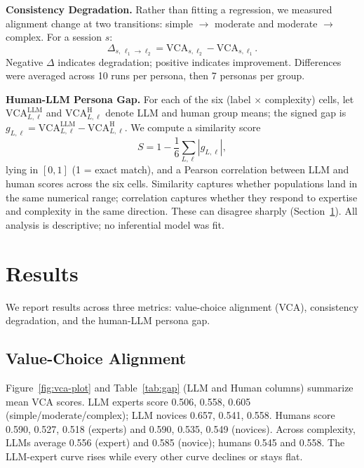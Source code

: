 \documentclass[manuscript,review]{acmart}
\begin{document}
\textbf{Consistency Degradation.} Rather than fitting a regression, we measured alignment change at two transitions: simple $\rightarrow$ moderate and moderate $\rightarrow$ complex. For a session $s$:
\begin{equation}
\Delta_{s,\,\ell_1 \rightarrow \ell_2} = \mathrm{VCA}_{s,\ell_2} - \mathrm{VCA}_{s,\ell_1}.
\end{equation}
Negative $\Delta$ indicates degradation; positive indicates improvement. Differences were averaged across 10 runs per persona, then 7 personas per group.

\textbf{Human-LLM Persona Gap.} For each of the six (label $\times$ complexity) cells, let $\mathrm{VCA}^{\text{LLM}}_{L,\ell}$ and $\mathrm{VCA}^{\text{H}}_{L,\ell}$ denote LLM and human group means; the signed gap is $g_{L,\ell} = \mathrm{VCA}^{\text{LLM}}_{L,\ell} - \mathrm{VCA}^{\text{H}}_{L,\ell}$. We compute a similarity score
\begin{equation}
S = 1 - \frac{1}{6}\sum_{L,\ell} |g_{L,\ell}|,
\end{equation}
lying in $[0,1]$ (1 = exact match), and a Pearson correlation between LLM and human scores across the six cells. Similarity captures whether populations land in the same numerical range; correlation captures whether they respond to expertise and complexity in the same direction. These can disagree sharply (Section~\ref{sec:results}). All analysis is descriptive; no inferential model was fit.

\section{Results}\label{sec:results}
We report results across three metrics: value-choice alignment (VCA), consistency degradation, and the human-LLM persona gap.

\subsection{Value-Choice Alignment}
Figure~\ref{fig:vca-plot} and Table~\ref{tab:gap} (LLM and Human columns) summarize mean VCA scores. LLM experts score 0.506, 0.558, 0.605 (simple/moderate/complex); LLM novices 0.657, 0.541, 0.558. Humans score 0.590, 0.527, 0.518 (experts) and 0.590, 0.535, 0.549 (novices). Across complexity, LLMs average 0.556 (expert) and 0.585 (novice); humans 0.545 and 0.558. The LLM-expert curve rises while every other curve declines or stays flat.
\end{document}
